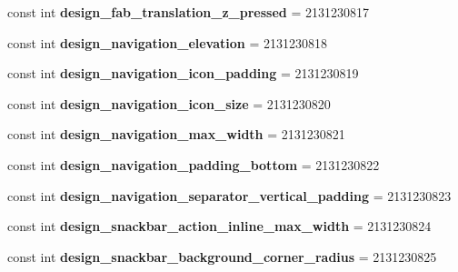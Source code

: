 \begin{DoxyCompactItemize}
const int {\bfseries design\+\_\+fab\+\_\+translation\+\_\+z\+\_\+pressed} = 2131230817
\item 
\mbox{\label{classst_delivery_1_1_resource_1_1_dimension_a302b055bfb32b315f285fad43a2d7455}} 
const int {\bfseries design\+\_\+navigation\+\_\+elevation} = 2131230818
\item 
\mbox{\label{classst_delivery_1_1_resource_1_1_dimension_a80e6d740081eb9021081e540f8240137}} 
const int {\bfseries design\+\_\+navigation\+\_\+icon\+\_\+padding} = 2131230819
\item 
\mbox{\label{classst_delivery_1_1_resource_1_1_dimension_ad521dae30854399e4057b4cfdfa31391}} 
const int {\bfseries design\+\_\+navigation\+\_\+icon\+\_\+size} = 2131230820
\item 
\mbox{\label{classst_delivery_1_1_resource_1_1_dimension_aa3ca11fbf8218f7bf1ca4b04464c41e7}} 
const int {\bfseries design\+\_\+navigation\+\_\+max\+\_\+width} = 2131230821
\item 
\mbox{\label{classst_delivery_1_1_resource_1_1_dimension_a1f30f84dcf6854e6ffb5e70ae4967fbe}} 
const int {\bfseries design\+\_\+navigation\+\_\+padding\+\_\+bottom} = 2131230822
\item 
\mbox{\label{classst_delivery_1_1_resource_1_1_dimension_a9c5501f7bbe12a64afd56b5270107361}} 
const int {\bfseries design\+\_\+navigation\+\_\+separator\+\_\+vertical\+\_\+padding} = 2131230823
\item 
\mbox{\label{classst_delivery_1_1_resource_1_1_dimension_a05ca0ebd571eee502a0268f4ed8bf2d0}} 
const int {\bfseries design\+\_\+snackbar\+\_\+action\+\_\+inline\+\_\+max\+\_\+width} = 2131230824
\item 
\mbox{\label{classst_delivery_1_1_resource_1_1_dimension_a8fe62afb59d708cd3356815f0050e4fa}} 
const int {\bfseries design\+\_\+snackbar\+\_\+background\+\_\+corner\+\_\+radius} = 2131230825

\end{DoxyCompactItemize}
